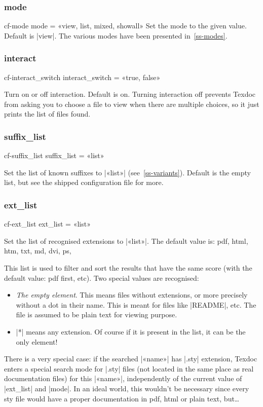 \documentclass[a4paper,oneside]{scrartcl}
\makeatletter
\newif\ifframed
\newenvironment{cmdsubsub}[2]
  {\framedfalse \commandes\subsubsection{#1}{#2}}
  {\endcommandes}
\newenvironment{htcode}
  {\SaveVerbatim[samepage, gobble=2]{verbmat}}
  {
    \endSaveVerbatim
    \par\medskip\noindent\hspace*{\parindent}%
    \BUseVerbatim{verbmat}%
    \par\medskip\@endpetrue
  }
\makeatother
\begin{document}
\begin{cmdsubsub}{mode}{cf-mode}
  mode = «view, list, mixed, showall»
\end{cmdsubsub}
Set the  mode to the given value. Default is |view|. The various modes
have been presented in~\ref{ss-modes}.

\begin{cmdsubsub}{interact}{cf-interact_switch}
  interact_switch = «true, false»
\end{cmdsubsub}

Turn on or off interaction. Default is on. Turning interaction off prevents
Texdoc from asking you to choose a file to view when there are multiple
choices, so it just prints the list of files found.

\begin{cmdsubsub}{suffix_list}{cf-suffix_list}
  suffix_list = «list»
\end{cmdsubsub}

Set the list of known suffixes to |«list»| (see~\ref{ss-variants}). Default is
the empty list, but see the shipped configuration file for more.

\begin{cmdsubsub}{ext_list}{cf-ext_list}
  ext_list = «list»
\end{cmdsubsub}

Set the list of recognised extensions to |«list»|. The default value is:
%
\begin{htcode}
  pdf, html, htm, txt, md, dvi, ps,
\end{htcode}
%
This list is used to filter and  sort the results that have the same
score (with the default value: pdf first, etc). Two special values are
recognised:
\begin{itemize}
  \item \emph{The empty element}. This means files without extensions, or more
    precisely without a dot in their name. This is meant for files like
    |README|, etc. The file is assumed to be plain text for viewing purpose.
  \item |*| means any extension. Of course if it is present in the list, it
    can be the only element!
\end{itemize}

There is a very special case: if the searched |«name»| has |.sty| extension,
Texdoc enters a special search mode for |.sty| files (not located in the same
place as real documentation files) for this |«name»|, independently of the
current value of |ext_list| and |mode|. In an ideal world, this wouldn't be
necessary since every sty file would have a proper documentation in pdf, html
or plain text, but\dots
\end{document}
